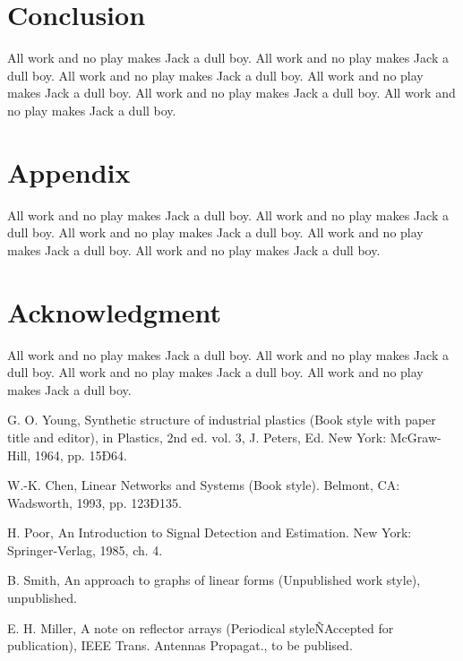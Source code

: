 \documentclass[twocolumn]{article}
\begin{document}
\section{Conclusion}

All work and no play makes Jack a dull boy.
All work and no play makes Jack a dull boy.
All work and no play makes Jack a dull boy.
All work and no play makes Jack a dull boy.
All work and no play makes Jack a dull boy.
All work and no play makes Jack a dull boy.

\section*{Appendix}

All work and no play makes Jack a dull boy.
All work and no play makes Jack a dull boy.
All work and no play makes Jack a dull boy.
All work and no play makes Jack a dull boy.
All work and no play makes Jack a dull boy.

\section*{Acknowledgment}

All work and no play makes Jack a dull boy.
All work and no play makes Jack a dull boy.
All work and no play makes Jack a dull boy.
All work and no play makes Jack a dull boy.

\begin{thebibliography}{99}

 G. O. Young, Synthetic structure of industrial plastics (Book style with paper title and editor),   in Plastics, 2nd ed. vol. 3, J. Peters, Ed.  New York: McGraw-Hill, 1964, pp. 15Ð64.

 W.-K. Chen, Linear Networks and Systems (Book style).  Belmont, CA: Wadsworth, 1993, pp. 123Ð135.

 H. Poor, An Introduction to Signal Detection and Estimation.   New York: Springer-Verlag, 1985, ch. 4.

 B. Smith, An approach to graphs of linear forms (Unpublished work style), unpublished.

 E. H. Miller, A note on reflector arrays (Periodical styleÑAccepted for publication), IEEE Trans. Antennas Propagat., to be publised.

\end{thebibliography}

\end{document}
